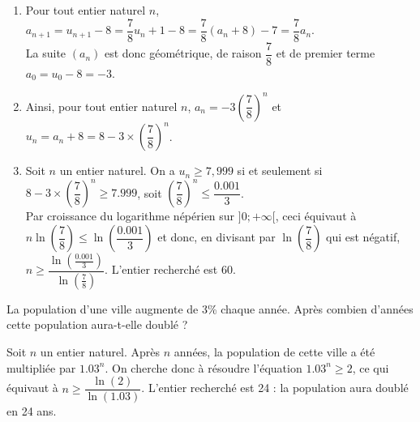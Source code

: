 \documentclass[11pt,fleqn, openany]{book} %
\begin{document}
\begin{solution}\hspace{0pt}

\begin{enumerate}\item Pour tout entier naturel \(n\), $a_{n+1}=u_{n+1}-8=\dfrac{7}{8}u_n+1-8=\dfrac{7}{8}(a_n+8)-7=\dfrac{7}{8}a_n$.\\
La suite \((a_n)\) est donc géométrique, de raison \(\dfrac{7}{8}\) et de premier terme \(a_0=u_0-8=-3\).

\item Ainsi, pour tout entier naturel \(n\), \(a_n=-3 \left(\dfrac{7}{8}\right)^n\) et \(u_n=a_n+8=8-3\times\left(\dfrac{7}{8}\right)^n\).

\item  Soit \(n\) un entier naturel. On a \(u_n \geqslant 7,999\) si et seulement si \(8-3\times\left(\dfrac{7}{8}\right)^n\geqslant 7.999\), soit \(\left(\dfrac{7}{8}\right)^n \leqslant \dfrac{0.001}{3}\). \\ Par croissance du logarithme népérien sur \(]0;+\infty[\), ceci équivaut à \(n\ln\left(\dfrac{7}{8}\right) \leqslant \ln\left(\dfrac{0.001}{3}\right)\) et donc, en divisant par \(\ln\left(\dfrac{7}{8}\right)\) qui est négatif,  \(n \geqslant \dfrac{\ln\left(\frac{0.001}{3}\right)}{\ln\left(\frac{7}{8}\right)}\). L'entier recherché est 60.\end{enumerate}
\end{solution}



\begin{exercise}[topic=log03]La population d'une ville augmente de 3\% chaque année. Après combien d'années cette population aura-t-elle doublé ?\end{exercise}

\begin{solution}

Soit \(n\) un entier naturel. Après \(n\) années, la population de cette ville a été multipliée par \(1.03^n\). On cherche donc à résoudre l'équation \(1.03^n \geqslant 2\), ce qui équivaut à \(n\geqslant \dfrac{\ln(2)}{\ln(1.03)}\). L'entier recherché est 24 : la population aura doublé en 24 ans.
\end{solution}
\end{document}
